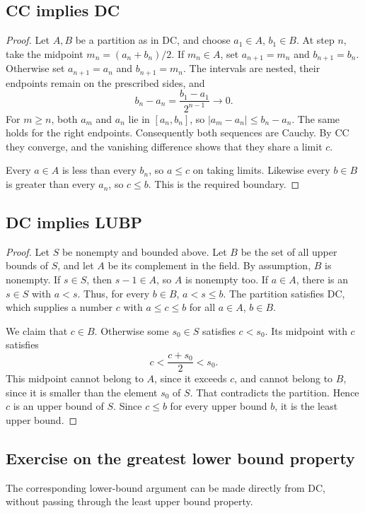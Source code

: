 \subsection{CC implies DC}
\begin{proof}
  Let $A,B$ be a partition as in DC, and choose $a_1\in A$, $b_1\in B$.
  At step $n$, take the midpoint $m_n=(a_n+b_n)/2$. If $m_n\in A$,
  set $a_{n+1}=m_n$ and $b_{n+1}=b_n$. Otherwise set $a_{n+1}=a_n$ and
  $b_{n+1}=m_n$. The intervals are nested, their endpoints remain on
  the prescribed sides, and
  \[
    b_n-a_n=\frac{b_1-a_1}{2^{n-1}}\longrightarrow0.
  \]
  For $m\geq n$, both $a_m$ and $a_n$ lie in $[a_n,b_n]$, so
  $|a_m-a_n|\leq b_n-a_n$. The same holds for the right endpoints.
  Consequently both sequences are Cauchy. By CC they converge, and the
  vanishing difference shows that they share a limit $c$.

  Every $a\in A$ is less than every $b_n$, so $a\leq c$ on taking limits.
  Likewise every $b\in B$ is greater than every $a_n$, so $c\leq b$.
  This is the required boundary.
\end{proof}

\subsection{DC implies LUBP}
\begin{proof}
  Let $S$ be nonempty and bounded above. Let $B$ be the set of all upper
  bounds of $S$, and let $A$ be its complement in the field. By assumption,
  $B$ is nonempty. If $s\in S$, then $s-1\in A$, so $A$ is nonempty too.
  If $a\in A$, there is an $s\in S$ with $a<s$. Thus, for every $b\in B$,
  $a<s\leq b$. The partition satisfies DC, which supplies a number $c$
  with $a\leq c\leq b$ for all $a\in A$, $b\in B$.

  We claim that $c\in B$. Otherwise some $s_0\in S$ satisfies $c<s_0$.
  Its midpoint with $c$ satisfies
  \[
    c<\frac{c+s_0}{2}<s_0.
  \]
  This midpoint cannot belong to $A$, since it exceeds $c$, and cannot
  belong to $B$, since it is smaller than the element $s_0$ of $S$.
  That contradicts the partition. Hence $c$ is an upper bound of $S$.
  Since $c\leq b$ for every upper bound $b$, it is the least upper bound.
\end{proof}

\subsection{Exercise on the greatest lower bound property}
The corresponding lower-bound argument can be made directly from DC,
without passing through the least upper bound property.

